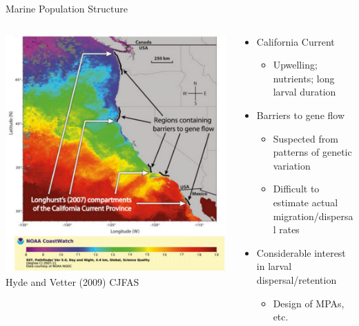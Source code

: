 \documentclass[letter,graphicx]{beamer}
\begin{document}
\begin{frame}{Marine Population Structure}
\begin{columns}
\begin{column}{0.45\textwidth}
\includegraphics[width=1.1\textwidth]{mhap_figs/vetter_coast.png}\\
{\tiny Hyde and Vetter (2009) CJFAS}
\end{column}
\begin{column}{0.55\textwidth}  %
\begin{itemize}
\item California Current
\begin{itemize}
\item Upwelling; nutrients; long larval duration
\end{itemize}
\item Barriers to gene flow
\begin{itemize}
\item Suspected from patterns of genetic variation
\item Difficult to estimate actual migration/dispersal rates
\end{itemize}
\item Considerable interest in larval dispersal/retention
\begin{itemize}
\item Design of MPAs, etc.
\end{itemize}
\end{itemize}

\end{column}
\end{columns}
\end{frame}
\end{document}
